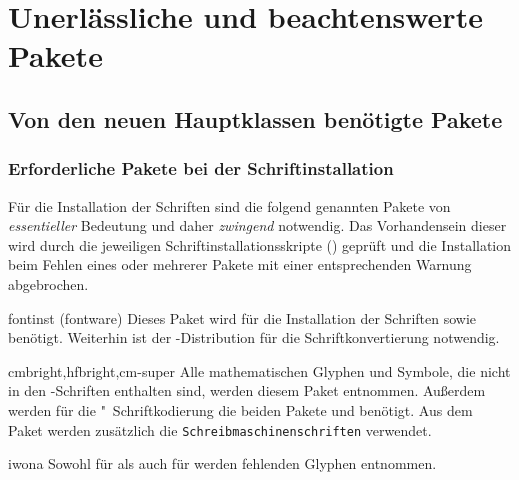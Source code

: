 \chapter{Unerlässliche und beachtenswerte Pakete}
\section{Von den neuen Hauptklassen benötigte Pakete}
\label{sec:packages:needed}
\subsection{Erforderliche Pakete bei der Schriftinstallation}
%
Für die Installation der Schriften sind die folgend genannten Pakete von
\emph{essentieller} Bedeutung und daher \emph{zwingend} notwendig. Das 
Vorhandensein dieser wird durch die jeweiligen Schriftinstallationsskripte
() geprüft und die Installation beim Fehlen eines 
oder mehrerer Pakete mit einer entsprechenden Warnung abgebrochen.
%
\begin{packages}
\item[fontinst](fontware)
  Dieses Paket wird für die Installation der Schriften \Univers sowie \DIN 
  benötigt. Weiterhin ist  der -Distribution 
  für die Schriftkonvertierung notwendig.
\item[cmbright,hfbright,cm-super]
  Alle mathematischen Glyphen und Symbole, die nicht in den \Univers-Schriften 
  enthalten sind, werden diesem Paket entnommen. Außerdem werden für die 
  "~Schriftkodierung die beiden Pakete  und 
   benötigt. Aus dem Paket  werden 
  zusätzlich die \texttt{Schreibmaschinenschriften} verwendet.
\item[iwona]
  Sowohl für \Univers als auch für \DIN werden fehlenden Glyphen entnommen.
\end{packages}



